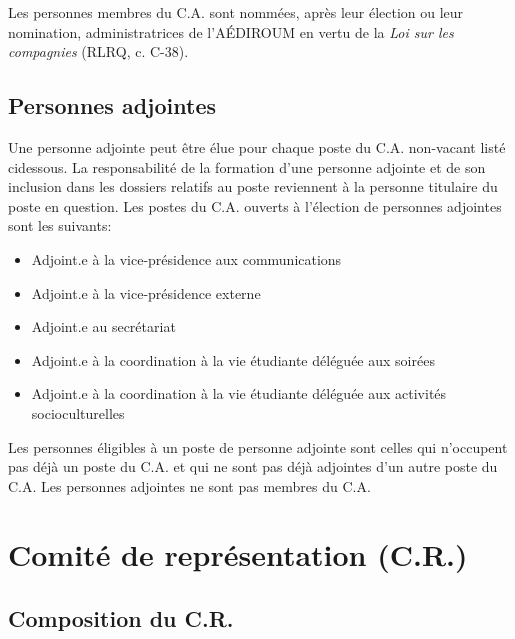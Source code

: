 \documentclass{aediroum}
\begin{document}
Les personnes membres du C.A. sont nommées, après leur élection ou leur nomination, administratrices de l'AÉDIROUM en vertu de la \textit{Loi sur les compagnies} (RLRQ, c. C-38).

\subsection{Personnes adjointes}\label{sec:adjoints}

Une personne adjointe peut être élue pour chaque poste du C.A. non-vacant listé cidessous.
La responsabilité de la formation d’une personne adjointe et de son inclusion
dans les dossiers relatifs au poste reviennent à la personne titulaire du poste en question.
Les postes du C.A. ouverts à l’élection de personnes adjointes sont les suivants:
\begin{itemize}
\item Adjoint.e à la vice-présidence aux communications
\item Adjoint.e à la vice-présidence externe
\item Adjoint.e au secrétariat
\item Adjoint.e à la coordination à la vie étudiante déléguée aux soirées
\item Adjoint.e à la coordination à la vie étudiante déléguée aux activités socioculturelles
\end{itemize}
Les personnes éligibles à un poste de personne adjointe sont celles qui n’occupent pas
déjà un poste du C.A. et qui ne sont pas déjà adjointes d’un autre poste du C.A. Les
personnes adjointes ne sont pas membres du C.A.

\section{Comité de représentation (C.R.)}
\subsection{Composition du C.R.}
\label{sec:composition-du-conseil-dadministration}
\end{document}
